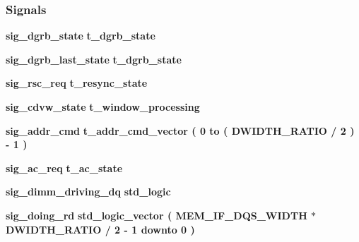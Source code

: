 \subsubsection*{Signals}
 \begin{DoxyCompactItemize}
\item 
{\bf sig\+\_\+dgrb\+\_\+state} {\bfseries {\bfseries {\bf t\+\_\+dgrb\+\_\+state}} \textcolor{vhdlchar}{ }} 
\item 
{\bf sig\+\_\+dgrb\+\_\+last\+\_\+state} {\bfseries {\bfseries {\bf t\+\_\+dgrb\+\_\+state}} \textcolor{vhdlchar}{ }} 
\item 
{\bf sig\+\_\+rsc\+\_\+req} {\bfseries {\bfseries {\bf t\+\_\+resync\+\_\+state}} \textcolor{vhdlchar}{ }} 
\item 
{\bf sig\+\_\+cdvw\+\_\+state} {\bfseries {\bfseries {\bf t\+\_\+window\+\_\+processing}} \textcolor{vhdlchar}{ }} 
\item 
{\bf sig\+\_\+addr\+\_\+cmd} {\bfseries {\bfseries {\bf t\+\_\+addr\+\_\+cmd\+\_\+vector}} \textcolor{vhdlchar}{ }\textcolor{vhdlchar}{(}\textcolor{vhdlchar}{ }\textcolor{vhdlchar}{ } \textcolor{vhdldigit}{0} \textcolor{vhdlchar}{ }\textcolor{keywordflow}{to}\textcolor{vhdlchar}{ }\textcolor{vhdlchar}{(}\textcolor{vhdlchar}{ }\textcolor{vhdlchar}{ }\textcolor{vhdlchar}{ }\textcolor{vhdlchar}{ }{\bfseries {\bf D\+W\+I\+D\+T\+H\+\_\+\+R\+A\+T\+IO}} \textcolor{vhdlchar}{/}\textcolor{vhdlchar}{ } \textcolor{vhdldigit}{2} \textcolor{vhdlchar}{ }\textcolor{vhdlchar}{)}\textcolor{vhdlchar}{ }\textcolor{vhdlchar}{-\/}\textcolor{vhdlchar}{ } \textcolor{vhdldigit}{1} \textcolor{vhdlchar}{ }\textcolor{vhdlchar}{)}\textcolor{vhdlchar}{ }} 
\item 
{\bf sig\+\_\+ac\+\_\+req} {\bfseries {\bfseries {\bf t\+\_\+ac\+\_\+state}} \textcolor{vhdlchar}{ }} 
\item 
{\bf sig\+\_\+dimm\+\_\+driving\+\_\+dq} {\bfseries \textcolor{comment}{std\+\_\+logic}\textcolor{vhdlchar}{ }} 
\item 
{\bf sig\+\_\+doing\+\_\+rd} {\bfseries \textcolor{comment}{std\+\_\+logic\+\_\+vector}\textcolor{vhdlchar}{ }\textcolor{vhdlchar}{(}\textcolor{vhdlchar}{ }\textcolor{vhdlchar}{ }\textcolor{vhdlchar}{ }\textcolor{vhdlchar}{ }{\bfseries {\bf M\+E\+M\+\_\+\+I\+F\+\_\+\+D\+Q\+S\+\_\+\+W\+I\+D\+TH}} \textcolor{vhdlchar}{$\ast$}\textcolor{vhdlchar}{ }\textcolor{vhdlchar}{ }\textcolor{vhdlchar}{ }{\bfseries {\bf D\+W\+I\+D\+T\+H\+\_\+\+R\+A\+T\+IO}} \textcolor{vhdlchar}{/}\textcolor{vhdlchar}{ } \textcolor{vhdldigit}{2} \textcolor{vhdlchar}{-\/}\textcolor{vhdlchar}{ } \textcolor{vhdldigit}{1} \textcolor{vhdlchar}{ }\textcolor{keywordflow}{downto}\textcolor{vhdlchar}{ }\textcolor{vhdlchar}{ } \textcolor{vhdldigit}{0} \textcolor{vhdlchar}{ }\textcolor{vhdlchar}{)}\textcolor{vhdlchar}{ }} 

\end{DoxyCompactItemize}
